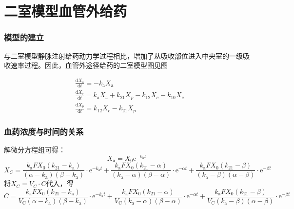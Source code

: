 \documentclass[dvipsnames, svgnames, x11names]{beamer}
\begin{document}
\section{二室模型血管外给药}


\begin{frame}
    \frametitle{模型的建立}
    与二室模型静脉注射给药动力学过程相比，增加了从吸收部位进入中央室的一级吸收速率过程。因此，血管外途径给药的二室模型图见图
    \begin{center}
    \end{center}
    \[
        \begin{aligned}
            &\frac{\mathrm{d}X_{\mathrm{a}}}{\mathrm{d}t} = -k_{\mathrm{a}}X_{\mathrm{a}} \\
            &\frac{\mathrm{d}X_{c}}{\mathrm{d}t} =k_{\mathrm{a}}X_{\mathrm{a}} + k_{21}X_{p}-k_{{12}}X_{c}-k_{{10}}X_{c}  \\
            &\frac{\mathrm{d}X_{p}}{\mathrm{d}t} =k_{{12}}X_{c}-k_{{21}}X_{p} 
        \end{aligned}
    \]
\end{frame}


\begin{frame}
    \frametitle{血药浓度与时间的关系}
    解微分方程组可得：
    \[
        X_{\mathrm{a}} = X_0 \mathrm{e}^{-k_{\mathrm{a}} t}
    \]
    \[
        X_{{C}}=\frac{k_{\mathrm{a}}FX_{0}(k_{21}-k_{\mathrm{a}})}{(\alpha-k_{\mathrm{a}})(\beta-k_{\mathrm{a}})}\cdot\mathrm{e}^{-k_{\mathrm{a}}t}+\frac{k_{\mathrm{a}}FX_{0}(k_{21}-\alpha)}{(k_{\mathrm{a}}-\alpha)(\beta-\alpha)}\cdot\mathrm{e}^{-\alpha t}+\frac{k_{\mathrm{a}}FX_{0}(k_{21}-\beta)}{(k_{\mathrm{a}}-\beta)(\alpha-\beta)}\cdot\mathrm{e}^{-\beta t}
    \]
    将$X_{{C}}=V_{{C}}\cdot C$代入，得
    \[
        C=\frac{k_{\mathrm{a}}FX_{0}(k_{21}-k_{\mathrm{a}})}{V_{\mathrm{C}}(\alpha-k_{\mathrm{a}})(\beta-k_{\mathrm{a}})}\cdot\mathrm{e}^{-k_{\mathrm{a}}t}+\frac{k_{\mathrm{a}}FX_{0}(k_{21}-\alpha)}{V_{\mathrm{C}}(k_{\mathrm{a}}-\alpha)(\beta-\alpha)}\cdot\mathrm{e}^{-\alpha t}+\frac{k_{\mathrm{a}}FX_{0}(k_{21}-\beta)}{V_{\mathrm{C}}(k_{\mathrm{a}}-\beta)(\alpha-\beta)}\cdot\mathrm{e}^{-\beta t}
    \]
\end{frame}
\end{document}
